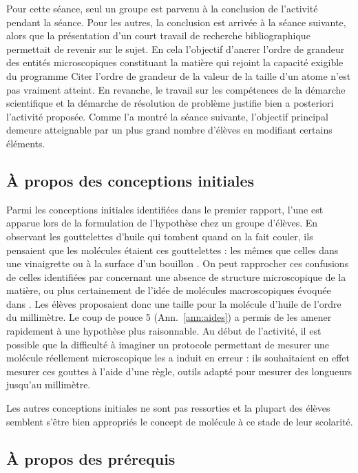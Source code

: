 \documentclass[12pt,a4paper, fleqn]{article}
\begin{document}
Pour cette séance, seul un groupe est parvenu à la conclusion de l'activité pendant la séance.
Pour les autres, la conclusion est arrivée à la séance suivante, alors que la présentation d'un court travail de recherche bibliographique permettait de revenir sur le sujet.
En cela l'objectif d'ancrer l'ordre de grandeur des entités microscopiques constituant la matière qui rejoint la capacité exigible du programme \og Citer l'ordre de grandeur de la valeur de la taille d'un atome \fg{} n'est pas vraiment atteint.
En revanche, le travail sur les compétences de la démarche scientifique et la démarche de résolution de problème justifie bien a posteriori l'activité proposée.
Comme l'a montré la séance suivante, l'objectif principal demeure atteignable par un plus grand nombre d'élèves en modifiant certains éléments.

\subsection{À propos des conceptions initiales}

Parmi les conceptions initiales identifiées dans le premier rapport, l'une est apparue lors de la formulation de l'hypothèse chez un groupe d'élèves.
En observant les gouttelettes d'huile qui tombent quand on la fait couler, ils pensaient que les molécules étaient ces gouttelettes : \og les mêmes que celles dans une vinaigrette ou à la surface d'un bouillon \fg{}.
On peut rapprocher ces confusions de celles identifiées par \cite{Bain1985} concernant une absence de structure microscopique de la matière, ou plus certainement de l'idée de molécules macroscopiques évoquée dans \cite{Griffiths1992}.
Les élèves proposaient donc une taille pour la molécule d'huile de l'ordre du millimètre.
Le coup de pouce 5 (Ann.~\ref{ann:aides}) a permis de les amener rapidement à une hypothèse plus raisonnable.
Au début de l'activité, il est possible que la difficulté à imaginer un protocole permettant de mesurer une molécule réellement microscopique les a induit en erreur : ils souhaitaient en effet mesurer ces gouttes à l'aide d'une règle, outils adapté pour mesurer des longueurs jusqu'au millimètre.

Les autres conceptions initiales ne sont pas ressorties et la plupart des élèves semblent s'être bien appropriés le concept de molécule à ce stade de leur scolarité.

\subsection{À propos des prérequis}
\end{document}
